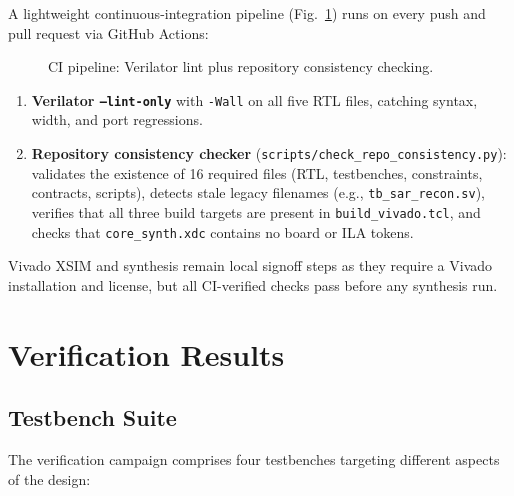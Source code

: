 \documentclass[journal]{IEEEtran}
\begin{document}
A lightweight continuous-integration pipeline (Fig.~\ref{fig:ci_flow}) runs
on every push and pull request via GitHub Actions:

\begin{figure}[!t]
\centering
{}
\caption{CI pipeline: Verilator lint plus repository consistency checking.}
\label{fig:ci_flow}
\end{figure}

\begin{enumerate}
    \item \textbf{Verilator \texttt{--lint-only}} with \texttt{-Wall} on all
          five RTL files, catching syntax, width, and port regressions.
    \item \textbf{Repository consistency checker} (\texttt{scripts/check\_repo\_consistency.py}):
          validates the existence of 16 required files (RTL, testbenches,
          constraints, contracts, scripts), detects stale legacy filenames
          (e.g., \texttt{tb\_sar\_recon.sv}), verifies that all three build
          targets are present in \texttt{build\_vivado.tcl}, and checks that
          \texttt{core\_synth.xdc} contains no board or ILA tokens.
\end{enumerate}

Vivado XSIM and synthesis remain local signoff steps as they require a Vivado
installation and license, but all CI-verified checks pass before any
synthesis run.

\section{Verification Results}
\label{sec:results}

\subsection{Testbench Suite}

The verification campaign comprises four testbenches targeting different
aspects of the design:
\end{document}
